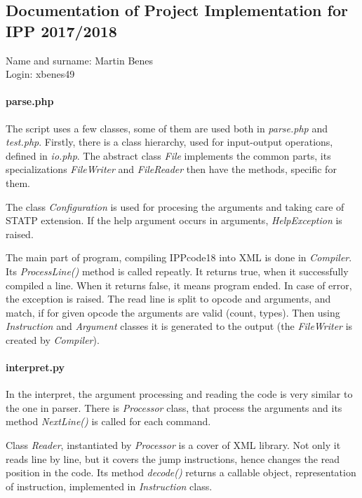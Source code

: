 \documentclass[10pt,a4paper,titlepage]{article}
\begin{document}

\setcounter{page}{1}

\begin{center}
\subsection*{Documentation of Project Implementation for IPP 2017/2018}
Name and surname: Martin Benes \\
Login: xbenes49
\end{center}

\paragraph{parse.php}
The script uses a few classes, some of them are used both in {\it parse.php}
and {\it test.php}. Firstly, there is a class hierarchy, used for input-output
operations, defined in {\it io.php}. The abstract class {\it File} implements
the common parts, its specializations {\it FileWriter} and {\it FileReader}
then have the methods, specific for them.

The class {\it Configuration} is used for procesing the arguments and
taking care of STATP extension. If the help argument occurs
in arguments, {\it HelpException} is raised.

The main part of program, compiling IPPcode18 into XML is done in {\it Compiler}.
Its {\it ProcessLine()} method is called repeatly. It returns true, when it
successfully compiled a line. When it returns false, it means program ended.
In case of error, the exception is raised. The read line is split to opcode
and arguments, and match, if for given opcode the arguments are valid
(count, types). Then using {\it Instruction} and {\it Argument} classes
it is generated to the output (the {\it FileWriter} is created by {\it Compiler}).


\paragraph{interpret.py}
In the interpret, the argument processing and reading the code is very similar
to the one in parser. There is {\it Processor} class, that process the
arguments and its method {\it NextLine()} is called for each command.

Class {\it Reader}, instantiated by {\it Processor} is a cover of XML library.
Not only it reads line by line, but it covers the jump instructions,
hence changes the read position in the code. Its method {\it decode()}
returns a callable object, representation of instruction, implemented
in {\it Instruction} class.
\end{document}
